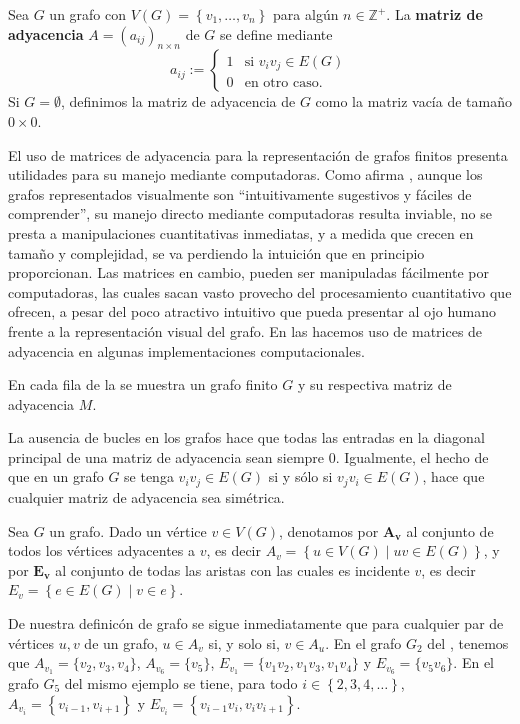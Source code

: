 \begin{Def}
   Sea $G$ un grafo con $V(G)=\left\lbrace v_1,\dots ,v_n\right\rbrace$ para algún $n\in\mathbb{Z}^+$. La \textbf{matriz de adyacencia} $A=(a_{ij})_{n\times n}$ de $G$ se define mediante
   $$
   a_{ij} := \begin{cases} 
     1 & \text{si } v_iv_j \in E(G) \\ 
     0 & \text{en otro caso.} 
   \end{cases}
   $$
   Si $G=\emptyset$, definimos la matriz de adyacencia de $G$ como la matriz vacía de tamaño $0\times 0$.
\end{Def}
El uso de matrices de adyacencia para la representación de grafos finitos presenta utilidades para su manejo mediante computadoras. Como afirma \cite{marimont1960}, aunque los grafos representados visualmente son ``intuitivamente sugestivos y fáciles de comprender'', su manejo directo mediante computadoras resulta inviable, no se presta a manipulaciones cuantitativas inmediatas, y a medida que crecen en tamaño y complejidad, se va perdiendo la intuición que en principio proporcionan. Las matrices en cambio, pueden ser manipuladas fácilmente por computadoras, las cuales sacan vasto provecho del procesamiento cuantitativo que ofrecen, a pesar del poco atractivo intuitivo que pueda presentar al ojo humano frente a la representación visual del grafo. En las  hacemos uso de matrices de adyacencia en algunas implementaciones computacionales.\clearpage
\begin{Ejm}
   En cada fila de la  se muestra un grafo finito $G$ y su respectiva matriz de adyacencia $M$.
   
\end{Ejm}
La ausencia de bucles en los grafos hace que todas las entradas en la diagonal principal de una matriz de adyacencia sean siempre $0$. Igualmente, el hecho de que en un grafo $G$ se tenga $v_iv_j\in E(G)$ si y sólo si $v_jv_i\in E(G)$, hace que cualquier matriz de adyacencia sea simétrica.\clearpage
\begin{Def}
   Sea $G$ un grafo. Dado un vértice $v\in V(G)$, denotamos por $\bm{A_v}$ al conjunto de todos los vértices adyacentes a $v$, es decir $A_v=\left\lbrace u\in V(G) \mid uv\in E(G)\right\rbrace$, y por $\bm{E_v}$ al conjunto de todas las aristas con las cuales es incidente $v$, es decir $E_v=\left\lbrace e\in E(G)\mid v\in e\right\rbrace$.
\end{Def}
De nuestra definicón de grafo se sigue inmediatamente que para cualquier par de vértices $u,v$ de un grafo, $u\in A_v$ si, y solo si, $v\in A_u$. En el grafo $G_2$ del , tenemos que $A_{v_1}=\lbrace v_2,v_3,v_4\rbrace$, $A_{v_6}=\lbrace v_5\rbrace$, $E_{v_1}=\lbrace v_1v_2,v_1v_3,v_1v_4 \rbrace$ y $E_{v_6}=\lbrace v_5v_6\rbrace$. En el grafo $G_5$ del mismo ejemplo se tiene, para todo $i\in \left\lbrace 2,3,4,\dots\right\rbrace$, $A_{v_i}=\left\lbrace v_{i-1}, v_{i+1}\right\rbrace$ y $E_{v_i}=\left\lbrace v_{i-1}v_i, v_iv_{i+1}\right\rbrace$.\\
